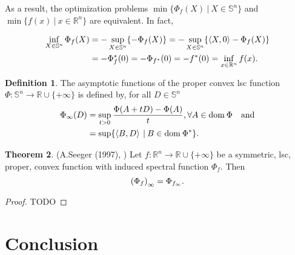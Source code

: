 \documentclass[a4paper,11pt, oneside]{book}
\theoremstyle{definition}
\newtheorem{dfn}{Definition}[section]
\newtheorem{thm}[dfn]{Theorem}
\newcommand{\RealNumberSet}{\mathbb{R}}
\newcommand{\NDemenstionalRealEuclideanSpace}{\mathbb{R}^n}
\newcommand{\NDemenstionalRealSymmetricMatrixSpace}{\mathbb{S}^n}
\newcommand{\Domain}[1]{\text{\rm dom\:${#1}$}} %
\newcommand{\InnerProduct}[2]{\left\langle {#1},{#2}\right\rangle} %
\newcommand{\ExtendedRealValuedFunction}[2]{{#1}: {#2} \to \RealNumberSet \cup \{+\infty\}}
\newcommand{\ConjugateFunction}[1]{{#1}^*}
\begin{document}
As a result, the optimization problems $\min \{\Phi_{f}(X) \:|\: X \in \NDemenstionalRealSymmetricMatrixSpace\}$ and $\min \{f(x) \:|\: x \in \NDemenstionalRealEuclideanSpace\}$ are equivalent. In fact,

\begin{align}
  \inf_{X \in \NDemenstionalRealSymmetricMatrixSpace} \Phi_{f}(X) &= - \sup_{X \in \NDemenstionalRealSymmetricMatrixSpace} \{- \Phi_{f}(X)\} = - \sup_{X \in \NDemenstionalRealSymmetricMatrixSpace} \{\InnerProduct{X}{0} - \Phi_{f}(X)\} \notag \\
  &= - \Phi^*_{f}(0) = - \Phi_{\ConjugateFunction{f}}(0) = - \ConjugateFunction{f}(0) = \inf_{x \in \NDemenstionalRealEuclideanSpace} f(x). \notag
\end{align}

\begin{dfn}
  The asymptotic functions of the proper convex lsc function $\ExtendedRealValuedFunction{\Phi}{\NDemenstionalRealSymmetricMatrixSpace}$ is defined by, for all $D \in \NDemenstionalRealSymmetricMatrixSpace$
  \begin{equation}
    \begin{split}
      \Phi_{\infty} (D) &= \sup_{t > 0} \frac{\Phi(A+tD) -\Phi(A)}{t}, \forall A \in \Domain{\Phi} \quad \text{and} \\
      &= \sup \{\InnerProduct{B}{D} \:|\: B \in \Domain{\ConjugateFunction{\Phi}}\}. \notag
    \end{split}
  \end{equation}
\end{dfn}

\begin{thm}{(A.Seeger (1997), \cite{Seeger97})}
  Let $\ExtendedRealValuedFunction{f}{\NDemenstionalRealEuclideanSpace}$ be a symmetric, lsc, proper, convex function with induced spectral function $\Phi_{f}$. Then
  \begin{equation}
    {(\Phi_{f})}_{\infty} = \Phi_{f_{\infty}}. \notag
  \end{equation}
\end{thm}

\begin{proof}
  TODO
\end{proof}
\chapter{Conclusion}
\blindtext
\end{document}
